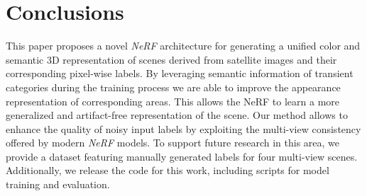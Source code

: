 
\section{Conclusions}

This paper proposes a novel \emph{NeRF} architecture for generating a unified color and semantic 3D representation of scenes derived from satellite images and their corresponding pixel-wise labels. 
By leveraging semantic information of transient categories during the training process we are able to improve the appearance representation of corresponding areas.
This allows the NeRF to learn a more generalized and artifact-free representation of the scene. 
Our method allows to enhance the quality of noisy input labels by exploiting the multi-view consistency offered by modern \emph{NeRF} models.
To support future research in this area, we provide a dataset featuring manually generated labels for four multi-view scenes. 
Additionally, we release the code for this work, including scripts for model training and evaluation.
